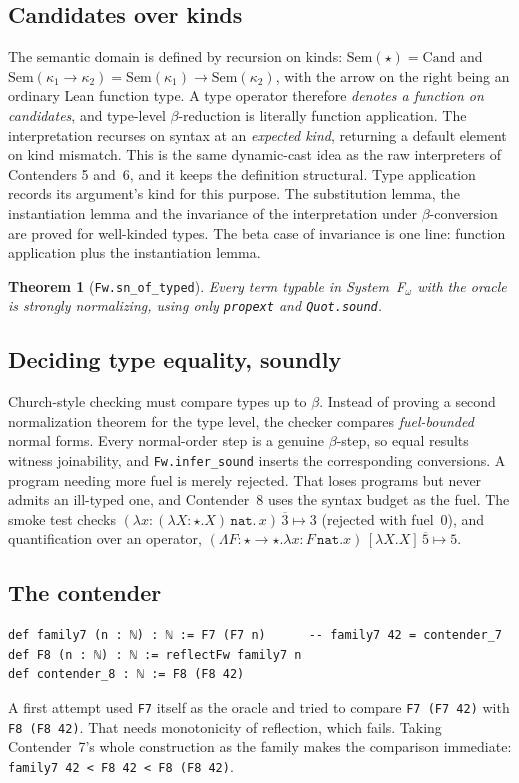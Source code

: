 \documentclass[11pt]{article}
\newtheorem{theorem}{Theorem}
\theoremstyle{definition}
\theoremstyle{remark}
\newcommand{\lean}[1]{\texttt{#1}}
\begin{document}
\subsection{Candidates over kinds}
The semantic domain is defined by recursion on kinds:
$\mathrm{Sem}(\star)=\mathrm{Cand}$ and
$\mathrm{Sem}(\kappa_1\to\kappa_2)=\mathrm{Sem}(\kappa_1)\to\mathrm{Sem}(\kappa_2)$,
with the arrow on the right being an ordinary Lean function type. A type
operator therefore \emph{denotes a function on candidates}, and type-level
$\beta$-reduction is literally function application. The interpretation
recurses on syntax at an \emph{expected kind}, returning a default element on
kind mismatch. This is the same dynamic-cast idea as the raw interpreters of
Contenders 5 and~6, and it keeps the definition structural. Type application
records its argument's kind for this purpose. The substitution lemma, the
instantiation lemma and the invariance of the interpretation under
$\beta$-conversion are proved for well-kinded types. The beta case of
invariance is one line: function application plus the instantiation lemma.

\begin{theorem}[\lean{Fw.sn\_of\_typed}]
Every term typable in System~F$_\omega$ with the oracle is strongly normalizing,
using only \lean{propext} and \lean{Quot.sound}.
\end{theorem}

\subsection{Deciding type equality, soundly}
Church-style checking must compare types up to $\beta$. Instead of proving a
second normalization theorem for the type level, the checker compares
\emph{fuel-bounded} normal forms. Every normal-order step is a genuine
$\beta$-step, so equal results witness joinability, and \lean{Fw.infer\_sound}
inserts the corresponding conversions. A program needing more fuel is merely
rejected. That loses programs but never admits an ill-typed one, and
Contender~8 uses the syntax budget as the fuel. The smoke test checks
$(\lambda x{:}(\lambda X{:}\star.X)\,\mathtt{nat}.\,x)\,\overline{3}\mapsto 3$
(rejected with fuel~0), and quantification over an operator,
$(\Lambda F{:}\star{\to}\star.\lambda x{:}F\,\mathtt{nat}.x)\,[\lambda X.X]\,\overline5\mapsto5$.

\subsection{The contender}
\begin{lstlisting}
def family7 (n : ℕ) : ℕ := F7 (F7 n)      -- family7 42 = contender_7
def F8 (n : ℕ) : ℕ := reflectFw family7 n
def contender_8 : ℕ := F8 (F8 42)
\end{lstlisting}
A first attempt used \lean{F7} itself as the oracle and tried to compare
\lean{F7 (F7 42)} with \lean{F8 (F8 42)}. That needs monotonicity of
reflection, which fails. Taking Contender~7's whole construction as the
family makes the comparison immediate:
\lean{family7 42 < F8 42 < F8 (F8 42)}.
\end{document}
